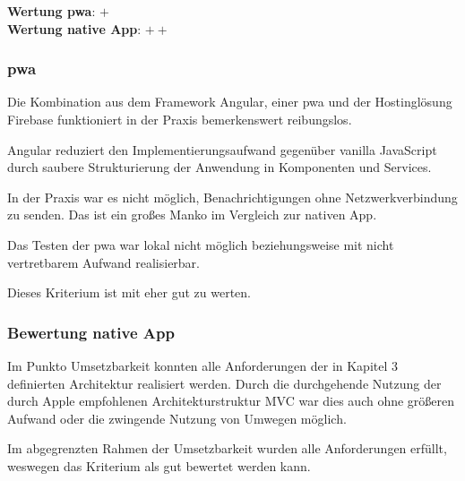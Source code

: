 \textbf{Wertung \ac{pwa}}: $+$\\
\textbf{Wertung native App}: $++$ \\

\subsubsection{\ac{pwa}}
Die Kombination aus dem Framework Angular, einer \ac{pwa} und der Hostinglösung Firebase funktioniert in der Praxis bemerkenswert reibungslos.

Angular reduziert den Implementierungsaufwand gegenüber vanilla JavaScript durch saubere Strukturierung der Anwendung in Komponenten und Services.

In der Praxis war es nicht möglich, Benachrichtigungen ohne Netzwerkverbindung zu senden. Das ist ein großes Manko im Vergleich zur nativen App.

Das Testen der \ac{pwa} war lokal nicht möglich beziehungsweise mit nicht vertretbarem Aufwand realisierbar.

Dieses Kriterium ist mit eher gut zu werten.

\subsubsection{Bewertung native App}
Im Punkto Umsetzbarkeit konnten alle Anforderungen der in Kapitel 3 definierten Architektur realisiert werden. Durch die durchgehende Nutzung der durch Apple empfohlenen Architekturstruktur MVC war dies auch ohne größeren Aufwand oder die zwingende Nutzung von Umwegen möglich.

Im abgegrenzten Rahmen der Umsetzbarkeit wurden alle Anforderungen erfüllt, weswegen das Kriterium als gut bewertet werden kann.